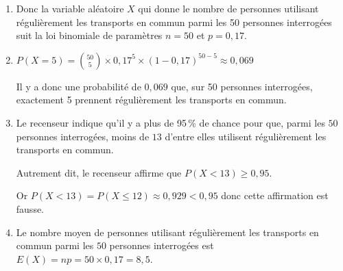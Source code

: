 \documentclass[10pt]{article}
\providecommand{\ds}{\displaystyle}
\begin{document}
\begin{enumerate}
\item 
{}

Donc la variable aléatoire $X$ qui donne le nombre de personnes utilisant régulièrement les transports en commun parmi les 50 personnes interrogées suit la loi binomiale de paramètres $n=50$ et $p=0,17$.

\item $P(X = 5) = \ds\binom{50}{5}\times 0,17^5 \times (1-0,17)^{50-5}\approx 0,069$


Il y a donc une probabilité de $0,069$ que, sur 50 personnes interrogées, exactement 5 prennent régulièrement les transports en commun.

\item Le recenseur indique qu'il y a plus de 95\,\% de chance pour que, parmi les $50$ personnes interrogées, moins de $13$ d'entre elles utilisent régulièrement les transports en commun.

Autrement dit, le recenseur affirme que $P(X<13) \geqslant 0,95$.

Or $P(X<13)= P(X \leqslant 12) \approx  0,929 < 0,95$ donc cette affirmation est fausse.

\item Le nombre moyen de personnes utilisant régulièrement les transports en commun parmi les $50$ personnes interrogées est
$E(X)=np=50\times 0,17 = 8,5$.
\end{enumerate}

\bigskip
\end{document}

